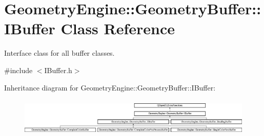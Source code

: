 \hypertarget{class_geometry_engine_1_1_geometry_buffer_1_1_i_buffer}{}\section{Geometry\+Engine\+::Geometry\+Buffer\+::I\+Buffer Class Reference}
\label{class_geometry_engine_1_1_geometry_buffer_1_1_i_buffer}


Interface class for all buffer classes.  




{\ttfamily \#include $<$I\+Buffer.\+h$>$}

Inheritance diagram for Geometry\+Engine\+::Geometry\+Buffer\+::I\+Buffer\+:\begin{figure}[H]
\begin{center}
\leavevmode
\includegraphics[height=1.857380cm]{class_geometry_engine_1_1_geometry_buffer_1_1_i_buffer}
\end{center}
\end{figure}
